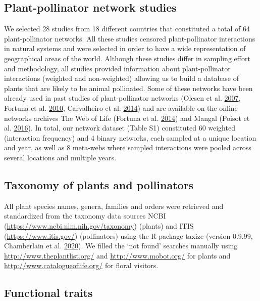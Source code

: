 \documentclass[11pt,a4paper,]{article}
\begin{document}
\subsection{Plant-pollinator network
studies}\label{plant-pollinator-network-studies}

We selected 28 studies from 18 different countries that constituted a
total of 64 plant-pollinator networks. All these studies censored
plant-pollinator interactions in natural systems and were selected in
order to have a wide representation of geographical areas of the world.
Although these studies differ in sampling effort and methodology, all
studies provided information about plant-pollinator interactions
(weighted and non-weighted) allowing us to build a database of plants
that are likely to be animal pollinated. Some of these networks have
been already used in past studies of plant-pollinator networks (Olesen
et al. \protect\hyperlink{ref-olesen2007}{2007}, Fortuna et al.
\protect\hyperlink{ref-fortuna2010}{2010}, Carvalheiro et al.
\protect\hyperlink{ref-carvalheiro2014}{2014}) and are available on the
online networks archives The Web of Life (Fortuna et al.
\protect\hyperlink{ref-fortuna2014}{2014}) and Mangal (Poisot et al.
\protect\hyperlink{ref-poisot2016}{2016}). In total, our network dataset
(Table S1) constituted 60 weighted (interaction frequency) and 4 binary
networks, each sampled at a unique location and year, as well as 8
meta-webs where sampled interactions were pooled across several
locations and multiple years.

\subsection{Taxonomy of plants and
pollinators}\label{taxonomy-of-plants-and-pollinators}

All plant species names, genera, families and orders were retrieved and
standardized from the taxonomy data sources NCBI
(\url{https://www.ncbi.nlm.nih.gov/taxonomy}) (plants) and ITIS
(\url{https://www.itis.gov/}) (pollinators) using the R package taxize
(version 0.9.99, Chamberlain et al.
\protect\hyperlink{ref-chamberlain2020}{2020}). We filled the `not
found' searches manually using \url{http://www.theplantlist.org/} and
\url{http://www.mobot.org/} for plants and
\url{http://www.catalogueoflife.org/} for floral visitors.

\subsection{Functional traits}\label{functional-traits}
\end{document}

